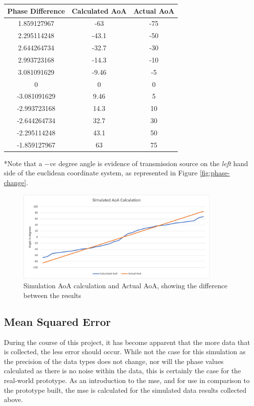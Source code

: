 \documentclass[class=report,11pt,crop=false]{standalone}
\begin{document}
\begin{center}
    \begin{tabular}{c|c|c}
        \textbf{Phase Difference} & \textbf{Calculated AoA} & \textbf{Actual AoA}   \\
        \hline
        1.859127967 & -63 & -75 \\ 
        2.295114248 & -43.1 & -50 \\
        2.644264734 & -32.7 & -30 \\
        2.993723168 & -14.3 & -10 \\
        3.081091629 & -9.46 & -5\\
        0 & 0 & 0\\
        -3.081091629 & 9.46 & 5\\
        -2.993723168 & 14.3 & 10\\
        -2.644264734& 32.7 & 30\\
        -2.295114248 & 43.1 & 50\\
        -1.859127967 & 63 & 75\\
    \end{tabular}
\end{center}

*Note that a $-ve$ degree angle is evidence of transmission source on the \emph{left} hand side of the euclidean coordinate system, as represented in Figure \ref{fig:phase-change}. 

\begin{figure}[h]
    \centering
    \includegraphics[width=0.9\textwidth]{Images/plots/simulatedaoa.png}
    \caption{Simulation AoA calculation and Actual AoA, showing the difference between the results}
    \label{fig:sim-graph}
\end{figure}

\subsection{Mean Squared Error}
During the course of this project, it has become apparent that the more data that is collected, the less error should occur. While not the case for this simulation as the precision of the data types does not change, nor will the phase values calculated as there is no noise within the data, this is certainly the case for the real-world prototype. As an introduction to the \gls{mse}, and for use in comparison to the prototype built, the \gls{mse} is calculated for the simulated data results collected above.
\end{document}
